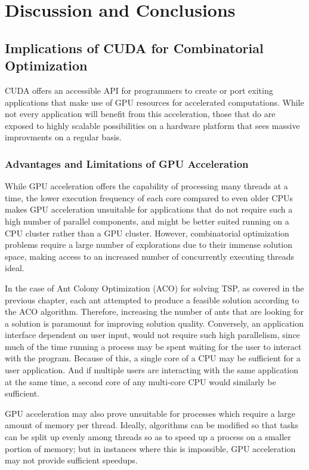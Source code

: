 \documentclass[11pt]{report}
\begin{document}
\chapter{Discussion and Conclusions}


    \section{Implications of CUDA for Combinatorial Optimization}
    CUDA offers an accessible API for programmers to create or port exiting applications that make use of GPU resources for accelerated computations. While not every application will benefit from this acceleration, those that do are exposed to highly scalable possibilities on a hardware platform that sees massive improvments on a regular basis.

        \subsection{Advantages and Limitations of GPU Acceleration}
        While GPU acceleration offers the capability of processing many threads at a time, the lower execution frequency of each core compared to even older CPUs makes GPU acceleration unsuitable for applications that do not require such a high number of parallel components, and might be better suited running on a CPU cluster rather than a GPU cluster. However, combinatorial optimization problems require a large number of explorations due to their immense solution space, making access to an increased number of concurrently executing threads ideal.

        In the case of Ant Colony Optimization (ACO) for solving TSP, as covered in the previous chapter, each ant attempted to produce a feasible solution according to the ACO algorithm. Therefore, increasing the number of ants that are looking for a solution is paramount for improving solution quality. Conversely, an application interface dependent on user input, would not require such high parallelism, since much of the time running a process may be spent waiting for the user to interact with the program. Because of this, a single core of a CPU may be sufficient for a user application. And if multiple users are interacting with the same application at the same time, a second core of any multi-core CPU would similarly be sufficient.

        GPU acceleration may also prove unsuitable for processes which require a large amount of memory per thread. Ideally, algorithms can be modified so that tasks can be split up evenly among threads so as to speed up a process on a smaller portion of memory; but in instances where this is impossible, GPU acceleration may not provide sufficient speedups.
\end{document}
